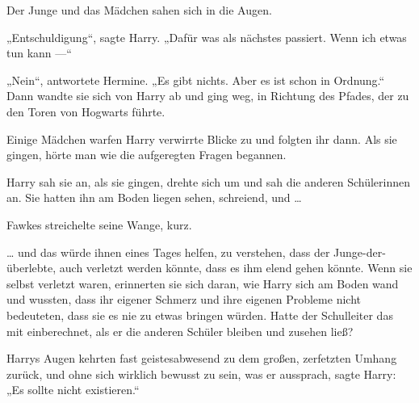 Der Junge und das Mädchen sahen sich in die Augen.

„Entschuldigung“, sagte Harry.
„Dafür was als nächstes passiert. Wenn ich etwas tun kann —“

„Nein“, antwortete Hermine.
„Es gibt nichts. Aber es ist schon in Ordnung.“ Dann wandte sie sich von Harry ab und ging weg, in Richtung des Pfades, der zu den Toren von Hogwarts führte.

Einige Mädchen warfen Harry verwirrte Blicke zu und folgten ihr dann. Als sie gingen, hörte man wie die aufgeregten Fragen begannen.

Harry sah sie an, als sie gingen, drehte sich um und sah die anderen Schülerinnen an. Sie hatten ihn am Boden liegen sehen, schreiend, und …

Fawkes streichelte seine Wange, kurz.

… und das würde ihnen eines Tages helfen, zu verstehen, dass der Junge-der-überlebte, auch verletzt werden könnte, dass es ihm elend gehen könnte. Wenn sie selbst verletzt waren, erinnerten sie sich daran, wie Harry sich am Boden wand und wussten, dass ihr eigener Schmerz und ihre eigenen Probleme nicht bedeuteten, dass sie es nie zu etwas bringen würden. Hatte der Schulleiter das mit einberechnet, als er die anderen Schüler bleiben und zusehen ließ?

Harrys Augen kehrten fast geistesabwesend zu dem großen, zerfetzten Umhang zurück, und ohne sich wirklich bewusst zu sein, was er aussprach, sagte Harry:
„Es sollte nicht existieren.“

